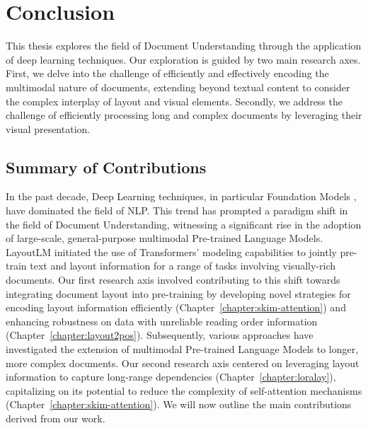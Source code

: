 
\chapter{Conclusion}
\label{chapter:conclusion}

\acresetall
{}


This thesis explores the field of Document Understanding through the application of deep learning techniques. Our exploration is guided by two main research axes. First, we delve into the challenge of efficiently and effectively encoding the multimodal nature of documents, extending beyond textual content to consider the complex interplay of layout and visual elements. Secondly, we address the challenge of efficiently processing long and complex documents by leveraging their visual presentation.

\section{Summary of Contributions}

In the past decade, Deep Learning techniques, in particular Foundation Models \citep{devlin2018bert, radford2019language, touvron2023llama}, have dominated the field of \ac{NLP}. This trend has prompted a paradigm shift in the field of Document Understanding, witnessing a significant rise in the adoption of large-scale, general-purpose multimodal Pre-trained Language Models. LayoutLM \citep{xu2020layoutlm} initiated the use of Transformers' modeling capabilities \citep{vaswani2017attention} to jointly pre-train text and layout information for a range of tasks involving visually-rich documents. Our first research axis involved contributing to this shift towards integrating document layout into pre-training by developing novel strategies for encoding layout information efficiently (Chapter~\ref{chapter:skim-attention}) and enhancing robustness on data with unreliable reading order information (Chapter~\ref{chapter:layout2pos}). Subsequently, various approaches have investigated the extension of multimodal Pre-trained Language Models to longer, more complex documents. Our second research axis centered on leveraging layout information to capture long-range dependencies (Chapter~\ref{chapter:loralay}), capitalizing on its potential to reduce the complexity of self-attention mechanisms (Chapter~\ref{chapter:skim-attention}). We will now outline the main contributions derived from our work.



